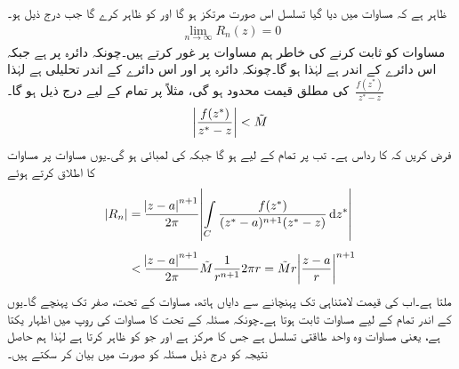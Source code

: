 ظاہر ہے کہ مساوات  میں دیا گیا تسلسل اس صورت مرتکز ہو گا اور  کو ظاہر کرے گا جب درج ذیل ہو۔
\begin{align}\label{مساوات_ٹیلر_کوشی_کلیہ_تکمل_ٹیلر_چ}
\lim_{n\to\infty} R_n(z)=0
\end{align}
مساوات  کو ثابت کرنے کی خاطر ہم مساوات  پر غور کرتے ہیں۔چونکہ  دائرہ  پر ہے جبکہ  اس دائرے کے اندر ہے لہٰذا  ہو گا۔چونکہ  دائرہ  پر اور اس دائرے کے اندر تحلیلی ہے لہٰذا 
$\,\tfrac{f(z^*)}{z^*-z}\,$
کی مطلق قیمت محدود ہو گی، مثلاً  پر تمام  کے لیے درج ذیل ہو گا۔ 
\begin{align*}
\abs{\frac{f(z^*)}{z^*-z}}<\tilde{M}
\end{align*}
فرض کریں کہ  کا رداس  ہے۔ تب  پر تمام  کے لیے   ہو گا جبکہ  کی لمبائی  ہو گی۔یوں مساوات  پر مساوات  کا اطلاق کرتے ہوئے 
\begin{align*}
\abs{R_n}&=\frac{\abs{z-a}^{n+1}}{2\pi}\abs{\int\limits_C \frac{f(z^*)}{(z^*-a)^{n+1}(z^*-z)}\dif z^*}\\[0.5em]
&<\frac{\abs{z-a}^{n+1}}{2\pi} \tilde{M}\frac{1}{r^{n+1}}2\pi r=\tilde{M} r\abs{\frac{z-a}{r}}^{n+1}
\end{align*}
ملتا ہے۔اب  کی قیمت لامتناہی تک پہنچانے سے دایاں ہاتھ، مساوات  کے تحت، صفر تک پہنچے گا۔یوں   کے اندر تمام  کے لیے مساوات  ثابت ہوتا ہے۔چونکہ مسئلہ  کے تحت  کا مساوات  کی روپ میں اظہار یکتا ہے، یعنی مساوات  وہ واحد طاقتی تسلسل ہے جس کا مرکز  ہے اور جو  کو ظاہر کرتا ہے لہٰذا ہم حاصل نتیجہ کو درج ذیل مسئلہ کو صورت میں بیان کر سکتے ہیں۔


